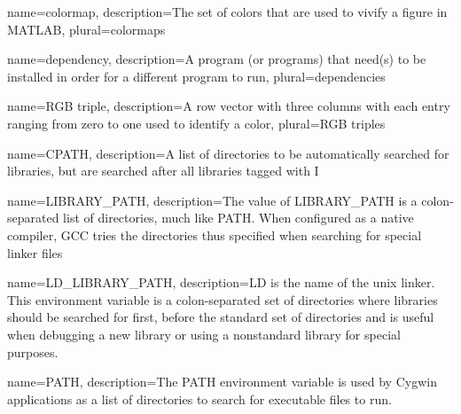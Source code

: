 {
    name=colormap,
    description={The set of colors that are used to vivify a figure in MATLAB},
    plural=colormaps
}
 
{
    name=dependency,
    description={A program (or programs) that need(s) to be installed in order for a different program to run},
    plural=dependencies
}
 
 {
  name={RGB triple},
  description={A row vector with three columns with each entry ranging from zero to one used to identify a color},
  plural=RGB triples
}

{
    name=CPATH,
    description={A list of directories to be automatically searched for libraries, but are searched after all libraries tagged with \-I}
}

{
    name=LIBRARY\_PATH,
    description={The value of LIBRARY\_PATH is a colon-separated list of directories, much like PATH. When configured as a native compiler, GCC tries the directories thus specified when searching for special linker files}
}
 
{
    name=LD\_LIBRARY\_PATH,
    description={LD is the name of the unix linker. This environment variable is a colon-separated set of directories where libraries should be searched for first, before the standard set of directories and is useful when debugging a new library or using a nonstandard library for special purposes.}
} 

{
    name=PATH,
    description={The PATH environment variable is used by Cygwin applications as a list of directories to search for executable files to run.}
}







